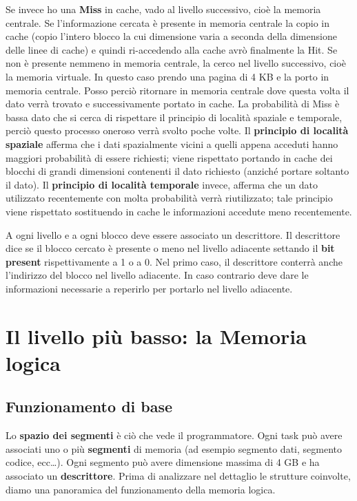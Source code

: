 \documentclass[11pt]{book}
\begin{document}
Se invece ho una {\bf Miss} in cache, vado al livello successivo,
cio\`e la memoria centrale. Se l'informazione cercata \`e presente in
memoria centrale la copio in cache (copio l'intero blocco la cui
dimensione varia a seconda della dimensione delle linee di cache) e
quindi ri-accedendo alla cache avr\`o finalmente la Hit. Se non \`e
presente nemmeno in memoria centrale, la cerco nel livello successivo,
cio\`e la memoria virtuale. In questo caso prendo una pagina di 4 KB e
la porto in memoria centrale. Posso perci\`o ritornare in memoria
centrale dove questa volta il dato verr\`a trovato e successivamente
portato in cache. La probabilit\`a di Miss \`e bassa dato che si cerca
di rispettare il principio di localit\`a spaziale e temporale,
perci\`o questo processo oneroso verr\`a svolto poche volte. Il {\bf
  principio di localit\`a spaziale} afferma che i dati spazialmente
vicini a quelli appena acceduti hanno maggiori probabilit\`a di essere
richiesti; viene rispettato portando in cache dei blocchi di grandi
dimensioni contenenti il dato richiesto (anzich\'e portare soltanto il
dato). Il {\bf principio di localit\`a temporale} invece, afferma che
un dato utilizzato recentemente con molta probabilit\`a verr\`a
riutilizzato; tale principio viene rispettato sostituendo in cache le
informazioni accedute meno recentemente.

\par\bigskip

A ogni livello e a ogni blocco deve essere associato un
descrittore. Il descrittore dice se il blocco cercato \`e presente o
meno nel livello adiacente settando il {\bf bit present}
rispettivamente a 1 o a 0. Nel primo caso, il descrittore conterr\`a
anche l'indirizzo del blocco nel livello adiacente. In caso contrario
deve dare le informazioni necessarie a reperirlo per portarlo nel
livello adiacente.

\section{Il livello pi\`u basso: la Memoria logica}

\subsection{Funzionamento di base}

Lo \textbf{spazio dei segmenti} \`e ci\`o che vede il
programmatore. Ogni task pu\`o avere associati uno o pi\`u {\bf
  segmenti} di memoria (ad esempio segmento dati, segmento codice,
ecc\dots). Ogni segmento pu\`o avere dimensione massima di 4 GB e ha
associato un {\bf descrittore}. Prima di analizzare nel dettaglio le
strutture coinvolte, diamo una panoramica del funzionamento della
memoria logica.
\end{document}
